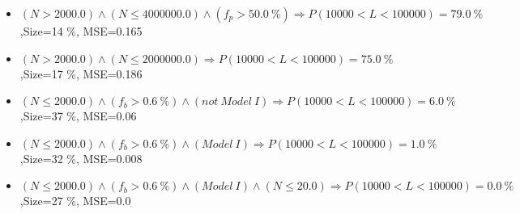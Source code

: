 \documentclass[numbered]{CSL}
\begin{document}
\begin{itemize}
\item $(N > 2000.0) \land (N \leq 4000000.0) \land (f_p > 50.0~\%) \Rightarrow P(10 000 < L < 100 000) = 79.0~\%$,\hfill Size=14 \%, MSE=0.165
\item $(N > 2000.0) \land (N \leq 2000000.0) \Rightarrow P(10 000 < L < 100 000) = 75.0~\%$,\hfill Size=17 \%, MSE=0.186
\item $(N \leq 2000.0) \land (f_b > 0.6~\%) \land (not~Model~I) \Rightarrow P(10 000 < L < 100 000) = 6.0~\%$,\hfill Size=37 \%, MSE=0.06
\item $(N \leq 2000.0) \land (f_b > 0.6~\%) \land (Model~I) \Rightarrow P(10 000 < L < 100 000) = 1.0~\%$,\hfill Size=32 \%, MSE=0.008
\item $(N \leq 2000.0) \land (f_b > 0.6~\%) \land (Model~I) \land (N \leq 20.0) \Rightarrow P(10 000 < L < 100 000) = 0.0~\%$,\hfill Size=27 \%, MSE=0.0
\end{itemize}
\end{document}
